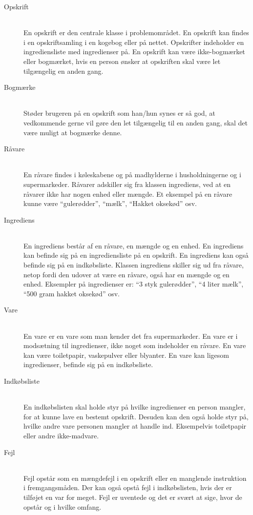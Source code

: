 \begin{description}
\item[Opskrift] \hfill \\
En opskrift er den centrale klasse i problemområdet. En opskrift kan findes i en opskriftsamling i en kogebog eller på nettet. Opskrifter indeholder en ingrediensliste med ingredienser på. En opskrift kan være ikke-bogmærket eller bogmærket, hvis en person ønsker at opskriften skal være let tilgængelig en anden gang.

\item[Bogmærke] \hfill \\
Støder brugeren på en opskrift som han/hun synes er så god, at vedkommende gerne vil gøre den let tilgængelig til en anden gang, skal det være muligt at bogmærke denne. 

\item[Råvare] \hfill \\
En råvare findes i køleskabene og på madhylderne i husholdningerne og i supermarkeder. Råvarer adskiller sig fra klassen ingrediens, ved at en råvarer ikke har nogen enhed eller mængde. Et eksempel på en råvare kunne være ``gulerødder'', ``mælk'', ``Hakket oksekød'' osv. 

\item[Ingrediens] \hfill \\ 
En ingrediens består af en råvare, en mængde og en enhed. En ingrediens kan befinde sig på en ingrediensliste på en opskrift. En ingrediens kan også befinde sig på en indkøbsliste. Klassen ingrediens skiller sig ud fra råvare, netop fordi den udover at være en råvare, også har en mængde og en enhed. Eksempler på ingredienser er: ``3 styk gulerødder'', ``4 liter mælk'', ``500 gram hakket oksekød'' osv.

\item[Vare] \hfill \\
En vare er en vare som man kender det fra supermarkeder. En vare er i modsætning til ingredienser, ikke noget som indeholder en råvare. En vare kan \fx være toiletpapir, vaskepulver eller blyanter. En vare kan ligesom ingredienser, befinde sig på en indkøbsliste.

\item[Indkøbsliste] \hfill \\
En indkøbslisten skal holde styr på hvilke ingredienser en person mangler, for at kunne lave en bestemt opskrift. Desuden kan den også holde styr på, hvilke andre vare personen mangler at handle ind. Eksempelvis toiletpapir eller andre ikke-madvare. 

\item[Fejl] \hfill \\
Fejl opstår som \fx en mængdefejl i en opskrift eller en manglende instruktion i fremgangsmåden. Der kan også opstå fejl i indkøbslisten, hvis der er tilføjet en var for meget. Fejl er uventede og det er svært at sige, hvor de opstår og i hvilke omfang.

\end{description}

